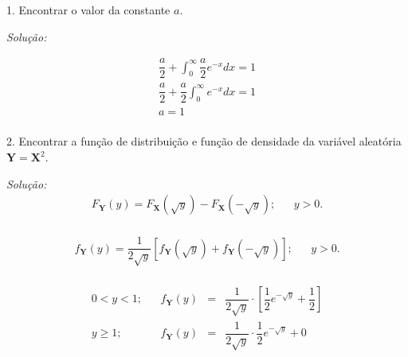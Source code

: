 \documentclass[a4paper, 11pt]{article}
\begin{document}
1. Encontrar o valor da constante $a$.

\noindent
\textit{Solução:} 

\begin{equation*}
\begin{array}{rclll}
\dfrac{a}{2} + \displaystyle\int_{0}^{\infty}\dfrac{a}{2}e^{-x}dx = 1 \\[15pt]
\dfrac{a}{2} + \dfrac{a}{2}\displaystyle\int_{0}^{\infty}e^{-x}dx = 1 \\[15pt]
a = 1 \\[15pt]
\end{array}
\end{equation*}

2. Encontrar a função de distribuição e função de densidade da variável aleatória $\mathbf{Y}=\mathbf{X}^{2}$.

\noindent
\textit{Solução:} \\
\begin{equation*}
\begin{array}{rclll}
F_{\mathbf{Y}}(y) = F_{\mathbf{X}}(\sqrt{y}) - F_{\mathbf{X}}(-\sqrt{y}); & & y > 0. \\[15pt]
\end{array}
\end{equation*}

\begin{equation*}
\begin{array}{rclll}
f_{\mathbf{Y}}(y) = \dfrac{1}{2\sqrt{y}} \left[ f_{\mathbf{Y}}(\sqrt{y}) + f_{\mathbf{Y}}(-\sqrt{y})\right]; & & y > 0. \\[15pt]
\end{array}
\end{equation*}

\begin{equation*}
\begin{array}{rclll}
0 < y < 1; & & f_{\mathbf{Y}}(y) & = & \dfrac{1}{2\sqrt{y}}\cdot \left[ \dfrac{1}{2} e^{-\sqrt{y}} + \dfrac{1}{2} \right] \\[15pt]

y \geq 1; & & f_{\mathbf{Y}}(y) & = & \dfrac{1}{2\sqrt{y}}\cdot \dfrac{1}{2} e^{-\sqrt{y}} + 0 \\[15pt]
\end{array}
\end{equation*}
\end{document}
